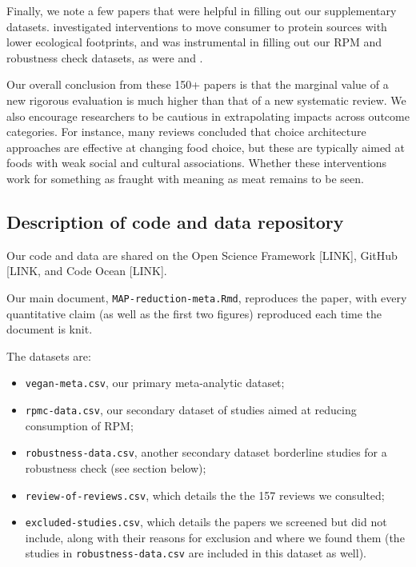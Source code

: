 \documentclass[sn-nature,referee,pdflatex]{sn-jnl}
\begin{document}
Finally, we note a few papers that were helpful in filling out our
supplementary datasets. \citep{ronto2022} investigated interventions to
move consumer to protein sources with lower ecological footprints, and
was instrumental in filling out our RPM and robustness check datasets,
as were \citep{kwasny2022} and \citep{grummon2023}.

Our overall conclusion from these 150+ papers is that the marginal value
of a new rigorous evaluation is much higher than that of a new
systematic review. We also encourage researchers to be cautious in
extrapolating impacts across outcome categories. For instance, many
reviews concluded that choice architecture approaches are effective at
changing food choice, but these are typically aimed at foods with weak
social and cultural associations. Whether these interventions work for
something as fraught with meaning as meat remains to be seen.

\subsection{Description of code and data
repository}\label{description-of-code-and-data-repository}

Our code and data are shared on the Open Science Framework {[}LINK{]},
GitHub {[}LINK, and Code Ocean {[}LINK{]}.

Our main document, \texttt{MAP-reduction-meta.Rmd}, reproduces the
paper, with every quantitative claim (as well as the first two figures)
reproduced each time the document is knit.

The datasets are:

\begin{itemize}
\item
  \texttt{vegan-meta.csv}, our primary meta-analytic dataset;
\item
  \texttt{rpmc-data.csv}, our secondary dataset of studies aimed at
  reducing consumption of RPM;
\item
  \texttt{robustness-data.csv}, another secondary dataset borderline
  studies for a robustness check (see section below);
\item
  \texttt{review-of-reviews.csv}, which details the the 157 reviews we
  consulted;
\item
  \texttt{excluded-studies.csv}, which details the papers we screened
  but did not include, along with their reasons for exclusion and where
  we found them (the studies in \texttt{robustness-data.csv} are
  included in this dataset as well).
\end{itemize}
\end{document}

